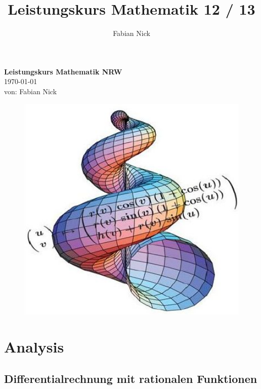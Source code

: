 \documentclass [a4paper, 12pt]{amsbook}
\begin{document}
\title{Leistungskurs Mathematik 12 / 13}
\author{Fabian Nick}

\begin{titlepage}
\begin{center}
\textbf{\LARGE Leistungskurs Mathematik NRW}\\

\today \\

von: Fabian Nick

\begin{figure}[hp]
	\centering
		\includegraphics[width=1.0\textwidth]{abbildungen/3dplot.jpg}
	\label{fig:3dplot}
\end{figure}

\end{center}
\end{titlepage}



\tableofcontents

\part {Analysis}

\chapter {Differentialrechnung mit rationalen Funktionen}

\end{document}
